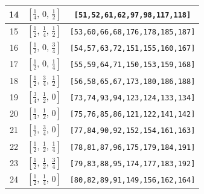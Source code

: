 \documentclass[fleqn,8pt]{jsarticle}
\begin{document}
\begin{longtable}{ccc}
14 & $\left[ \frac{1}{4},\, 0,\, \frac{1}{2} \right]$ & {\tt [51,52,61,62,97,98,117,118]} \\ \hline
15 & $\left[ \frac{1}{2},\, \frac{1}{4},\, \frac{1}{2} \right]$ & {\tt [53,60,66,68,176,178,185,187]} \\ \hline
16 & $\left[ \frac{1}{2},\, 0,\, \frac{3}{4} \right]$ & {\tt [54,57,63,72,151,155,160,167]} \\ \hline
17 & $\left[ \frac{1}{2},\, 0,\, \frac{1}{4} \right]$ & {\tt [55,59,64,71,150,153,159,168]} \\ \hline
18 & $\left[ \frac{1}{2},\, \frac{3}{4},\, \frac{1}{2} \right]$ & {\tt [56,58,65,67,173,180,186,188]} \\ \hline
19 & $\left[ \frac{3}{4},\, \frac{1}{2},\, 0 \right]$ & {\tt [73,74,93,94,123,124,133,134]} \\ \hline
20 & $\left[ \frac{1}{4},\, \frac{1}{2},\, 0 \right]$ & {\tt [75,76,85,86,121,122,141,142]} \\ \hline
21 & $\left[ \frac{1}{2},\, \frac{3}{4},\, 0 \right]$ & {\tt [77,84,90,92,152,154,161,163]} \\ \hline
22 & $\left[ \frac{1}{2},\, \frac{1}{2},\, \frac{1}{4} \right]$ & {\tt [78,81,87,96,175,179,184,191]} \\ \hline
23 & $\left[ \frac{1}{2},\, \frac{1}{2},\, \frac{3}{4} \right]$ & {\tt [79,83,88,95,174,177,183,192]} \\ \hline
24 & $\left[ \frac{1}{2},\, \frac{1}{4},\, 0 \right]$ & {\tt [80,82,89,91,149,156,162,164]} \\
\end{longtable}
\renewcommand{\arraystretch}{1.2}
\end{document}
